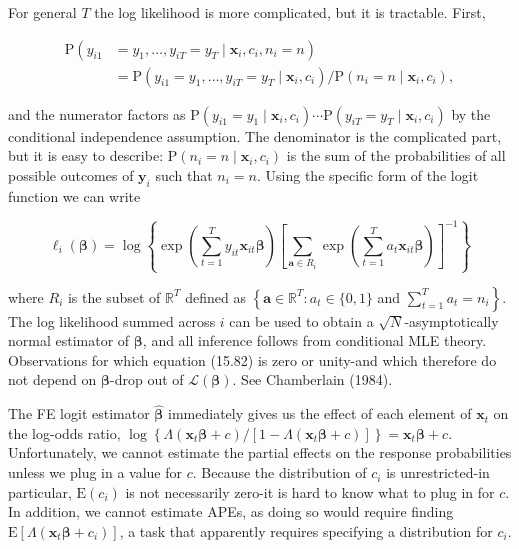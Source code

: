 \documentclass[10pt]{article}
\begin{document}
For general $T$ the log likelihood is more complicated, but it is tractable. First,


\begin{align*}
\mathrm{P}\left(y_{i 1}\right. & \left.=y_{1}, \ldots, y_{i T}=y_{T} \mid \mathbf{x}_{i}, c_{i}, n_{i}=n\right) \\
& =\mathrm{P}\left(y_{i 1}=y_{1}, \ldots, y_{i T}=y_{T} \mid \mathbf{x}_{i}, c_{i}\right) / \mathrm{P}\left(n_{i}=n \mid \mathbf{x}_{i}, c_{i}\right), \tag{15.82}
\end{align*}


and the numerator factors as $\mathrm{P}\left(y_{i 1}=y_{1} \mid \mathbf{x}_{i}, c_{i}\right) \cdots \mathrm{P}\left(y_{i T}=y_{T} \mid \mathbf{x}_{i}, c_{i}\right)$ by the conditional independence assumption. The denominator is the complicated part, but it is easy to describe: $\mathrm{P}\left(n_{i}=n \mid \mathbf{x}_{i}, c_{i}\right)$ is the sum of the probabilities of all possible outcomes of $\mathbf{y}_{i}$ such that $n_{i}=n$. Using the specific form of the logit function we can write


\begin{equation*}
\ell_{i}(\boldsymbol{\beta})=\log \left\{\exp \left(\sum_{t=1}^{T} y_{i t} \mathbf{x}_{i t} \boldsymbol{\beta}\right)\left[\sum_{\mathbf{a} \in R_{i}} \exp \left(\sum_{t=1}^{T} a_{t} \mathbf{x}_{i t} \boldsymbol{\beta}\right)\right]^{-1}\right\} \tag{15.83}
\end{equation*}


where $R_{i}$ is the subset of $\mathbb{R}^{T}$ defined as $\left\{\mathbf{a} \in \mathbb{R}^{T}: a_{t} \in\{0,1\}\right.$ and $\left.\sum_{t=1}^{T} a_{t}=n_{i}\right\}$. The log likelihood summed across $i$ can be used to obtain a $\sqrt{N}$-asymptotically normal estimator of $\boldsymbol{\beta}$, and all inference follows from conditional MLE theory. Observations for which equation (15.82) is zero or unity-and which therefore do not depend on $\boldsymbol{\beta}$-drop out of $\mathscr{L}(\boldsymbol{\beta})$. See Chamberlain (1984).

The FE logit estimator $\hat{\boldsymbol{\beta}}$ immediately gives us the effect of each element of $\mathbf{x}_{t}$ on the log-odds ratio, $\log \left\{\Lambda\left(\mathbf{x}_{t} \boldsymbol{\beta}+c\right) /\left[1-\Lambda\left(\mathbf{x}_{t} \boldsymbol{\beta}+c\right)\right]\right\}=\mathbf{x}_{t} \boldsymbol{\beta}+c$. Unfortunately, we cannot estimate the partial effects on the response probabilities unless we plug in a value for $c$. Because the distribution of $c_{i}$ is unrestricted-in particular, $\mathrm{E}\left(c_{i}\right)$ is not necessarily zero-it is hard to know what to plug in for $c$. In addition, we cannot estimate APEs, as doing so would require finding $\mathrm{E}\left[\Lambda\left(\mathbf{x}_{t} \boldsymbol{\beta}+c_{i}\right)\right]$, a task that apparently requires specifying a distribution for $c_{i}$.
\end{document}
